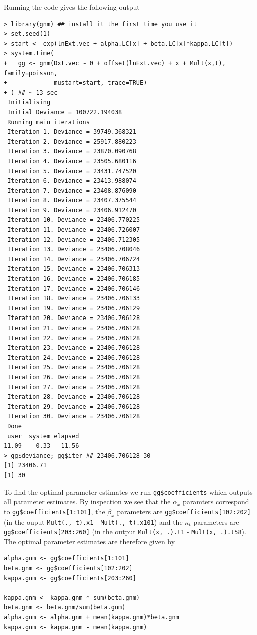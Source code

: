 \documentclass[11pt]{article}
\begin{document}
Running the code gives the following output
\begin{verbatim}
> library(gnm) ## install it the first time you use it
> set.seed(1)
> start <- exp(lnExt.vec + alpha.LC[x] + beta.LC[x]*kappa.LC[t])
> system.time(
+   gg <- gnm(Dxt.vec ~ 0 + offset(lnExt.vec) + x + Mult(x,t), family=poisson,
+             mustart=start, trace=TRUE)
+ ) ## ~ 13 sec
 Initialising
 Initial Deviance = 100722.194038
 Running main iterations
 Iteration 1. Deviance = 39749.368321
 Iteration 2. Deviance = 25917.880223
 Iteration 3. Deviance = 23870.090768
 Iteration 4. Deviance = 23505.680116
 Iteration 5. Deviance = 23431.747520
 Iteration 6. Deviance = 23413.988074
 Iteration 7. Deviance = 23408.876090
 Iteration 8. Deviance = 23407.375544
 Iteration 9. Deviance = 23406.912470
 Iteration 10. Deviance = 23406.770225
 Iteration 11. Deviance = 23406.726007
 Iteration 12. Deviance = 23406.712305
 Iteration 13. Deviance = 23406.708046
 Iteration 14. Deviance = 23406.706724
 Iteration 15. Deviance = 23406.706313
 Iteration 16. Deviance = 23406.706185
 Iteration 17. Deviance = 23406.706146
 Iteration 18. Deviance = 23406.706133
 Iteration 19. Deviance = 23406.706129
 Iteration 20. Deviance = 23406.706128
 Iteration 21. Deviance = 23406.706128
 Iteration 22. Deviance = 23406.706128
 Iteration 23. Deviance = 23406.706128
 Iteration 24. Deviance = 23406.706128
 Iteration 25. Deviance = 23406.706128
 Iteration 26. Deviance = 23406.706128
 Iteration 27. Deviance = 23406.706128
 Iteration 28. Deviance = 23406.706128
 Iteration 29. Deviance = 23406.706128
 Iteration 30. Deviance = 23406.706128
 Done
 user  system elapsed 
11.09    0.33   11.56 
> gg$deviance; gg$iter ## 23406.706128 30
[1] 23406.71
[1] 30
\end{verbatim}

To find the optimal parameter estimates we run \verb|gg$coefficients| which outputs all parameter estimates. By inspection we see that the $\alpha_x$ paramters correspond to \verb|gg$coefficients[1:101]|, the $\beta_x$ parameters are \verb|gg$coefficients[102:202]| (in the ouput \verb|Mult(., t).x1| - \verb|Mult(., t).x101|) and the $\kappa_t$ parameters are \verb|gg$coefficients[203:260]| (in the output \verb|Mult(x, .).t1| - \verb|Mult(x, .).t58|). The optimal parameter estimates are therefore given by 
\begin{verbatim}
alpha.gnm <- gg$coefficients[1:101]
beta.gnm <- gg$coefficients[102:202]
kappa.gnm <- gg$coefficients[203:260]

kappa.gnm <- kappa.gnm * sum(beta.gnm)
beta.gnm <- beta.gnm/sum(beta.gnm)
alpha.gnm <- alpha.gnm + mean(kappa.gnm)*beta.gnm
kappa.gnm <- kappa.gnm - mean(kappa.gnm)
\end{verbatim}
\end{document}
